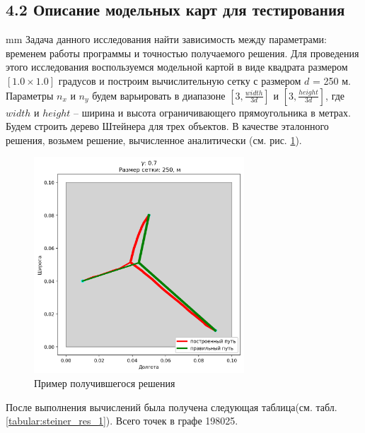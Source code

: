 \subsection*{\Large{4.2 Описание модельных карт для тестирования}}
 mm
Задача данного исследования найти зависимость между параметрами: временем работы программы и точностью получаемого решения. Для проведения этого исследования воспользуемся модельной картой в виде квадрата размером $[1.0 \times 1.0]$ градусов и построим вычислительную сетку с размером $d$ = 250 м. Параметры $n_x$  и $n_y$  будем варьировать в диапазоне $[3, \frac{width}{3d}]$ и $[3, \frac{height}{3d}]$, где $width$ и $height$ – ширина и высота ограничивающего прямоугольника в метрах. Будем строить дерево Штейнера для трех объектов. В качестве эталонного решения, возьмем решение, вычисленное аналитически (см. рис. \ref{pic:steiner_tree_1}).

\begin{figure}[H]
	\includegraphics[width=0.7\textwidth]{images/4_3.png}
	\caption{Пример получившегося решения}
	\label{pic:steiner_tree_1}
\end{figure}
\vskip 4mm


После выполнения вычислений была получена следующая таблица(см. табл. \ref{tabular:steiner_res_1}). Всего точек в графе 198025.

